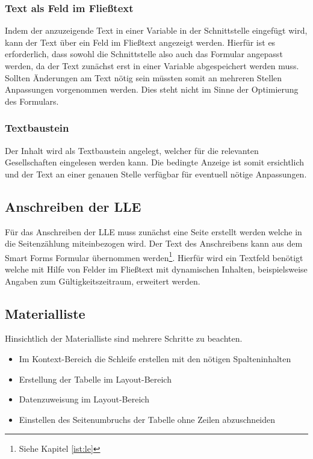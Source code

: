 \subsubsection{Text als Feld im Fließtext}

Indem der anzuzeigende Text in einer Variable in der Schnittstelle eingefügt wird, kann der Text über ein Feld im Fließtext angezeigt werden. Hierfür ist es erforderlich, dass sowohl die Schnittstelle also auch das Formular angepasst werden, da der Text zunächst erst in einer Variable abgespeichert werden muss. Sollten Änderungen am Text nötig sein müssten somit an mehreren Stellen Anpassungen vorgenommen werden. Dies steht nicht im Sinne der Optimierung des Formulars.

\subsubsection{Textbaustein}

Der Inhalt wird als Textbaustein angelegt, welcher für die relevanten Gesellschaften eingelesen werden kann. Die bedingte Anzeige ist somit ersichtlich und der Text an einer genauen Stelle verfügbar für eventuell nötige Anpassungen. 

\subsection{Anschreiben der \acs{LLE}}

Für das Anschreiben der \ac{LLE} muss zunächst eine Seite erstellt werden welche in die Seitenzählung miteinbezogen wird. Der Text des Anschreibens kann aus dem Smart Forms Formular übernommen werden\footnote{Siehe Kapitel \ref{ist:le}}. Hierfür wird ein Textfeld benötigt welche mit Hilfe von Felder im Fließtext mit dynamischen Inhalten, beispielsweise Angaben zum Gültigkeitszeitraum, erweitert werden. 

\subsection{Materialliste}

Hinsichtlich der Materialliste sind mehrere Schritte zu beachten.

\begin{itemize}
	\item Im Kontext-Bereich die Schleife erstellen mit den nötigen Spalteninhalten
	\item Erstellung der Tabelle im Layout-Bereich
	\item Datenzuweisung im Layout-Bereich
	\item Einstellen des Seitenumbruchs der Tabelle ohne Zeilen abzuschneiden
\end{itemize}

